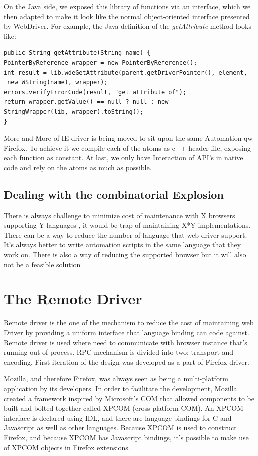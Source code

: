 \documentclass[12pt]{report}
\begin{document}
On the Java side, we exposed this library of functions via an interface, which we then adapted to make it look like the normal object-oriented interface presented by WebDriver. For example, the Java definition of the \textit{getAttribute} method looks like:
\begin{verbatim}
public String getAttribute(String name) {
PointerByReference wrapper = new PointerByReference();
int result = lib.wdeGetAttribute(parent.getDriverPointer(), element,
 new WString(name), wrapper);
errors.verifyErrorCode(result, "get attribute of");
return wrapper.getValue() == null ? null : new
StringWrapper(lib, wrapper).toString();
}
\end{verbatim}
More and More of IE driver is being moved to sit upon the same Automation qw Firefox. To achieve it we compile each of the atoms as c++ header file, exposing each function as constant. At last, we only have Interaction of API’s in native code and rely on the atoms as much as possible.

\subsection*{Dealing with the combinatorial Explosion}
There is always challenge to minimize cost of maintenance with X browsers supporting Y languages , it would be trap of maintaining X*Y implementations. There can be a way to reduce the number of language that web driver support. It’s always better to write automation scripts in the same language that they work on. There is also a way of reducing the supported browser but it will also not be a feasible solution

\section*{The Remote Driver}
Remote driver is the one of the mechanism to reduce the cost of maintaining web Driver by providing a uniform interface that language binding can code against. Remote driver is used where need to communicate with browser instance that’s running out of process. RPC mechanism is divided into two: transport and encoding. First iteration of the design was developed as a part of Firefox driver. 

Mozilla, and therefore Firefox, was always seen as being a multi-platform application by its developers. In order to facilitate the development, Mozilla created a framework inspired by Microsoft's COM that allowed components to be built and bolted together called XPCOM (cross-platform COM). An XPCOM interface is declared using IDL, and there are language bindings for C and Javascript as well as other languages. Because XPCOM is used to construct Firefox, and because XPCOM has Javascript bindings, it's possible to make use of XPCOM objects in Firefox extensions.
\end{document}
